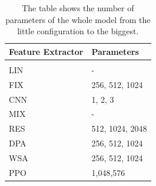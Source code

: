 \begin{table}[ht]
    \begin{center}
        \begin{tabular}{ll}
            \multicolumn{1}{l}{\textbf{Feature Extractor}}  &\multicolumn{1}{l}{\textbf{Parameters}}
            \\ \hline \\
            LIN              &  - \\
            FIX        & 256, 512, 1024 \\
            CNN       & 1, 2, 3\\
            MIX                             & - \\
            RES           & 512, 1024, 2048 \\
            DPA             & 256, 512, 1024 \\
            WSA         & 256, 512, 1024 \\
            PPO             & 1,048,576\\

        \end{tabular}
    \end{center}
    \caption{The table shows the number of parameters of the whole model from the little configuration to the biggest.}
    \label{tab:parameters}
\end{table}